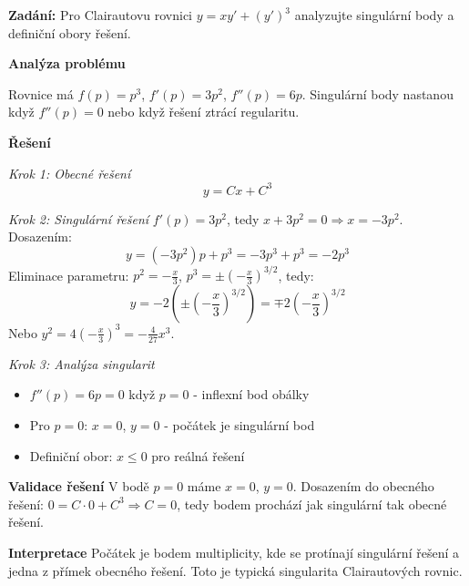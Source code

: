 \begin{example}
\label{ex:singularni-analyza}

\noindent\textbf{Zadání:} Pro Clairautovu rovnici $y = xy' + (y')^3$ analyzujte singulární body a definiční obory řešení.

\vspace{1.5\baselineskip}

\noindent\textbf{Analýza problému}

Rovnice má $f(p) = p^3$, $f'(p) = 3p^2$, $f''(p) = 6p$. Singulární body nastanou když $f''(p) = 0$ nebo když řešení ztrácí regularitu.

\vspace{1.5\baselineskip}

\noindent\textbf{Řešení}

\noindent\textit{Krok 1: Obecné řešení}
\[
y = Cx + C^3
\]

\vspace{1\baselineskip}

\noindent\textit{Krok 2: Singulární řešení}
$f'(p) = 3p^2$, tedy $x + 3p^2 = 0 \Rightarrow x = -3p^2$. Dosazením:
\[
y = (-3p^2)p + p^3 = -3p^3 + p^3 = -2p^3
\]
Eliminace parametru: $p^2 = -\frac{x}{3}$, $p^3 = \pm\left(-\frac{x}{3}\right)^{3/2}$, tedy:
\[
y = -2\left(\pm\left(-\frac{x}{3}\right)^{3/2}\right) = \mp 2\left(-\frac{x}{3}\right)^{3/2}
\]
Nebo $y^2 = 4\left(-\frac{x}{3}\right)^3 = -\frac{4}{27}x^3$.

\vspace{1\baselineskip}

\noindent\textit{Krok 3: Analýza singularit}
\begin{itemize}
\item $f''(p) = 6p = 0$ když $p = 0$ - inflexní bod obálky
\item Pro $p = 0$: $x = 0$, $y = 0$ - počátek je singulární bod
\item Definiční obor: $x \leq 0$ pro reálná řešení
\end{itemize}

\vspace{1.5\baselineskip}

\noindent\textbf{Validace řešení}
V bodě $p = 0$ máme $x = 0$, $y = 0$. Dosazením do obecného řešení: $0 = C\cdot 0 + C^3 \Rightarrow C = 0$, tedy bodem prochází jak singulární tak obecné řešení.

\vspace{1.5\baselineskip}

\noindent\textbf{Interpretace}
Počátek je bodem multiplicity, kde se protínají singulární řešení a jedna z přímek obecného řešení. Toto je typická singularita Clairautových rovnic.

\end{example}

